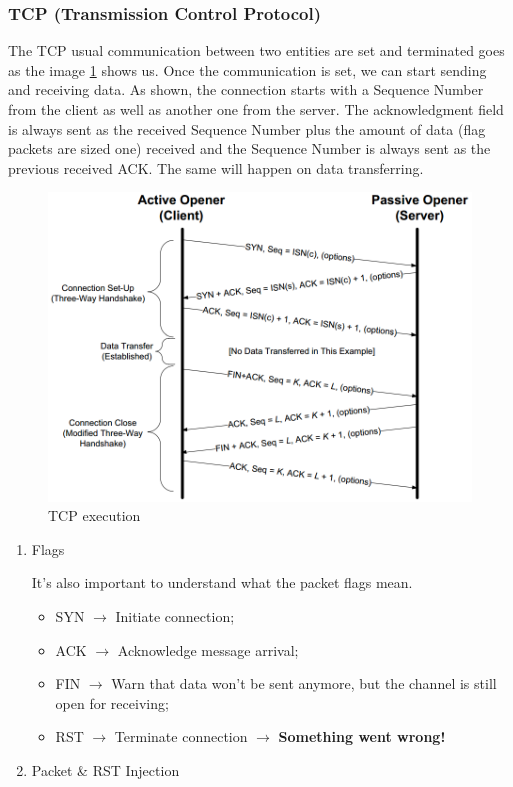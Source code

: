 \documentclass[11pt]{article}
\begin{document}
{\subsubsection{TCP (Transmission Control Protocol)}
\label{sec:orge3e90a8}
The TCP usual communication between two entities are set and terminated goes as the image \ref{tcp} shows us. Once the communication is set, we can start sending and receiving data. As shown, the connection starts with a Sequence Number from the client as well as another one from the server. The acknowledgment field is always sent as the received Sequence Number plus the amount of data (flag packets are sized one) received and the Sequence Number is always sent as the previous received ACK. The same will happen on data transferring.  

\begin{figure}[htbp]
\centering
\includegraphics[height=0.5\textwidth]{res/TCP.png}
\caption{\label{tcp}
TCP execution}
\end{figure} 

\begin{enumerate}
\item Flags
\label{sec:orgb8b3923}

It's also important to understand what the packet flags mean.
\begin{itemize}
\item SYN \(\to\) Initiate connection;
\item ACK \(\to\) Acknowledge message arrival;
\item FIN \(\to\) Warn that data won't be sent anymore, but the channel is still open for receiving;
\item RST \(\to\) Terminate connection \(\to\) \textbf{Something went wrong!}
\end{itemize}
\item Packet \& RST Injection
\label{sec:orge349e0b}


\end{enumerate}}
\end{document}
